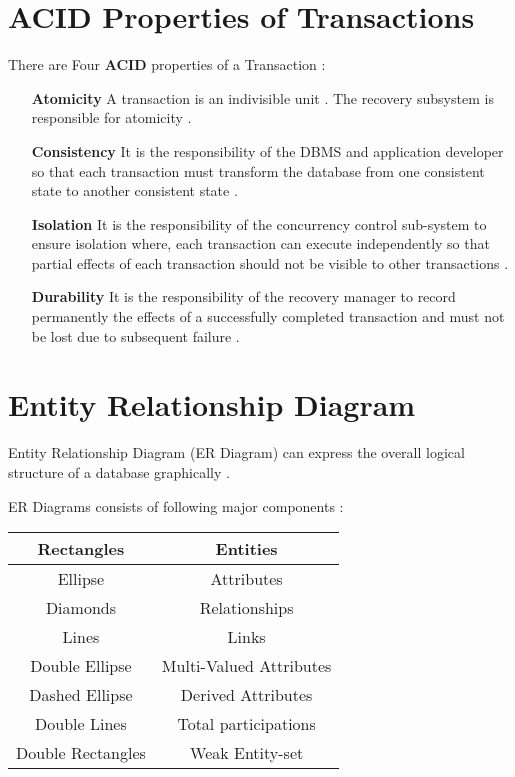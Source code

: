 \documentclass[10pt]{article}
\begin{document}
\section{ACID Properties of Transactions}

There are Four \textbf{ACID} properties of a Transaction :

\begin{itemize}
	\item [\textbf{Atomicity}] A transaction is an indivisible unit . The recovery subsystem is responsible for atomicity .
	\item [\textbf{Consistency}] It is the responsibility of the DBMS and application developer so that each transaction must transform the database from one consistent state to another consistent state .
	\item [\textbf{Isolation}] It is the responsibility of the concurrency control sub-system to ensure isolation where, each transaction can execute independently so that partial effects of each transaction should not be visible to other transactions .
	\item [\textbf{Durability}] It is the responsibility of the recovery manager to record permanently the effects of a successfully completed transaction and must not be lost due to subsequent failure .
\end{itemize}


\section{Entity Relationship Diagram}

Entity Relationship Diagram (ER Diagram) can express the overall logical structure of a database graphically .

ER Diagrams consists of following major components :

\begin{center}
  \bgroup
  \def\arraystretch{1.5}%
  \begin{tabular}{ c | c  }
    Rectangles & Entities \\ \hline
    Ellipse & Attributes \\ \hline
    Diamonds & Relationships \\ \hline
    Lines & Links \\ \hline
    Double Ellipse & Multi-Valued Attributes \\ \hline
    Dashed Ellipse & Derived Attributes \\ \hline
    Double Lines & Total participations \\ \hline
    Double Rectangles & Weak Entity-set \\ 
  \end{tabular}
  \egroup
\end{center}
\end{document}
